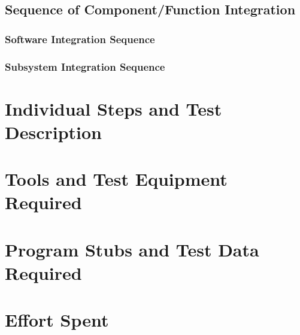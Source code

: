 \documentclass{article}
\begin{document}
 \subsection{Sequence of Component/Function Integration}
  \subsubsection{Software Integration Sequence}
  \subsubsection{Subsystem Integration Sequence}
  
\newpage

\section{Individual Steps and Test Description}

\newpage

\section{Tools and Test Equipment Required}

\newpage
\section{Program Stubs and Test Data Required}

\newpage
\section{Effort Spent}
\end{document}
